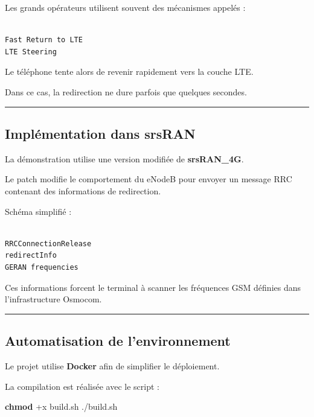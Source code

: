 \documentclass[
  french,
]{article}
\newenvironment{Shaded}{\begin{snugshade}}{\end{snugshade}}
\newcommand{\ExtensionTok}[1]{#1}
\newcommand{\FunctionTok}[1]{\textcolor[rgb]{0.13,0.29,0.53}{\textbf{#1}}}
\newcommand{\NormalTok}[1]{#1}
\begin{document}
Les grands opérateurs utilisent souvent des mécanismes appelés :

\begin{verbatim}

Fast Return to LTE
LTE Steering
\end{verbatim}

Le téléphone tente alors de revenir rapidement vers la couche LTE.

Dans ce cas, la redirection ne dure parfois que quelques secondes.

\begin{center}\rule{0.5\linewidth}{0.5pt}\end{center}

\subsection{Implémentation dans
srsRAN}\label{impluxe9mentation-dans-srsran}

La démonstration utilise une version modifiée de \textbf{srsRAN\_4G}.

Le patch modifie le comportement du eNodeB pour envoyer un message RRC
contenant des informations de redirection.

Schéma simplifié :

\begin{verbatim}

RRCConnectionRelease
redirectInfo
GERAN frequencies
\end{verbatim}

Ces informations forcent le terminal à scanner les fréquences GSM
définies dans l'infrastructure Osmocom.

\begin{center}\rule{0.5\linewidth}{0.5pt}\end{center}

\subsection{Automatisation de
l'environnement}\label{automatisation-de-lenvironnement}

Le projet utilise \textbf{Docker} afin de simplifier le déploiement.

La compilation est réalisée avec le script :

\begin{Shaded}
\begin{Highlighting}[]
\FunctionTok{chmod}\NormalTok{ +x build.sh}
\ExtensionTok{./build.sh}
\end{Highlighting}
\end{Shaded}
\end{document}
